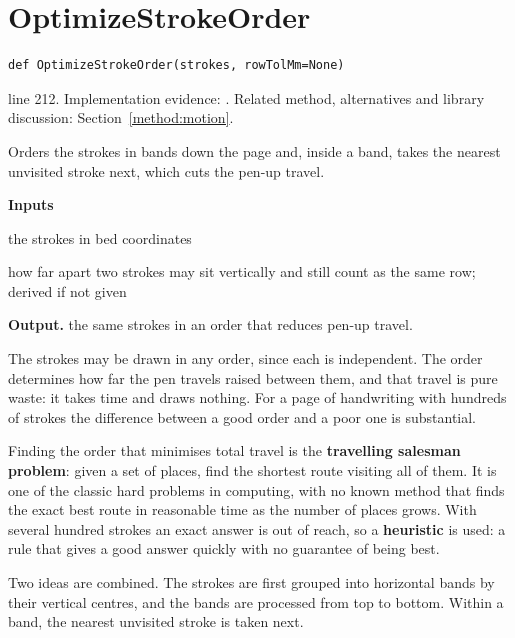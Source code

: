 \section{OptimizeStrokeOrder}\label{fn:reproduce:OptimizeStrokeOrder}
\begin{lstlisting}[style=sig]
def OptimizeStrokeOrder(strokes, rowTolMm=None)
\end{lstlisting}
 line 212. Implementation evidence: \cite{code2026}. Related method, alternatives and library discussion: Section~\ref{method:motion}.


Orders the strokes in bands down the page and, inside a band, takes the nearest unvisited stroke next, which cuts the pen-up travel.




\noindent\textbf{Inputs}
\begin{description}[leftmargin=2.2em,style=nextline,font=\normalfont\ttfamily]\setlength\itemsep{1pt}
  \item[{strokes}] \normalfont the strokes in bed coordinates
  \item[{rowTolMm}] \normalfont how far apart two strokes may sit vertically and still count as the same row; derived if not given
\end{description}

\noindent\textbf{Output.} the same strokes in an order that reduces pen-up travel.


The strokes may be drawn in any order, since each is independent. The order determines how far the pen travels raised between them, and that travel is pure waste: it takes time and draws nothing. For a page of handwriting with hundreds of strokes the difference between a good order and a poor one is substantial.


Finding the order that minimises total travel is the \textbf{travelling salesman problem}: given a set of places, find the shortest route visiting all of them. It is one of the classic hard problems in computing, with no known method that finds the exact best route in reasonable time as the number of places grows. With several hundred strokes an exact answer is out of reach, so a \textbf{heuristic} is used: a rule that gives a good answer quickly with no guarantee of being best.


Two ideas are combined. The strokes are first grouped into horizontal bands by their vertical centres, and the bands are processed from top to bottom. Within a band, the nearest unvisited stroke is taken next.


